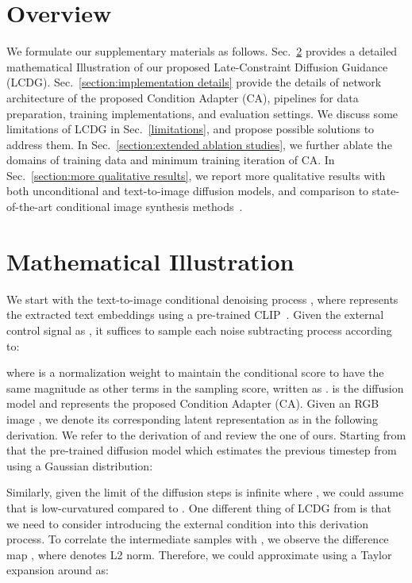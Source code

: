 \documentclass{article}
\begin{document}
{\small


}

\clearpage
\setcounter{section}{0}
\renewcommand\thesection{\Alph{section}}
\section{Overview}
We formulate our supplementary materials as follows. Sec.~\ref{section:mathematical derivation} provides a detailed mathematical Illustration of our proposed Late-Constraint Diffusion Guidance (LCDG). Sec.~\ref{section:implementation details} provide the details of network architecture of the proposed Condition Adapter (CA), pipelines for data preparation, training implementations, and evaluation settings. We discuss some limitations of LCDG in Sec.~\ref{limitations}, and propose possible solutions to address them. In Sec.~\ref{section:extended ablation studies}, we further ablate the domains of training data and minimum training iteration of CA. In Sec.~\ref{section:more qualitative results}, we report more qualitative results with both unconditional and text-to-image diffusion models, and comparison to state-of-the-art conditional image synthesis methods~\cite{rombach2022high,mou2023t2i,zhang2023adding}.

\section{Mathematical Illustration}
\label{section:mathematical derivation}

We start with the text-to-image conditional denoising process , where  represents the extracted text embeddings using a pre-trained CLIP~\cite{radford2021learning}. Given the external control signal as , it suffices to sample each noise subtracting process according to:

where  is a normalization weight to maintain the conditional score to have the same magnitude as other terms in the sampling score, written as .  is the diffusion model and  represents the proposed Condition Adapter (CA). Given an RGB image , we denote its corresponding latent representation as  in the following derivation. We refer to the derivation of \cite{dhariwal2021diffusion} and review the one of ours. Starting from that the pre-trained diffusion model \cite{rombach2022high} which estimates the previous timestep  from  using a Gaussian distribution:

Similarly, given the limit of the diffusion steps is infinite where , we could assume that  is low-curvatured compared to . One different thing of LCDG from \cite{dhariwal2021diffusion} is that we need to consider introducing the external condition  into this derivation process. To correlate the intermediate samples  with , we observe the difference map , where  denotes L2 norm. Therefore, we could approximate  using a Taylor expansion around  as:
\end{document}
